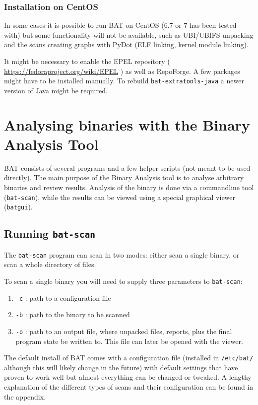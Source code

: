 \documentclass[10pt,a4paper]{article}
\begin{document}
\subsubsection{Installation on CentOS}

In some cases it is possible to run BAT on CentOS (6.7 or 7 has been tested
with) but some functionality will not be available, such as UBI/UBIFS
unpacking and the scans creating graphs with PyDot (ELF linking, kernel module
linking).

It might be necessary to enable the EPEL repository (
\url{https://fedoraproject.org/wiki/EPEL} ) as well as RepoForge. A few
packages might have to be installed manually. To rebuild
\texttt{bat-extratools-java} a newer version of Java might be required.

\section{Analysing binaries with the Binary Analysis Tool}

BAT consists of several programs and a few helper scripts (not meant to be
used directly). The main purpose of the Binary Analysis tool is to analyse
arbitrary binaries and review results. Analysis of the binary is done via
a commandline tool (\texttt{bat-scan}), while the results can be viewed using
a special graphical viewer (\texttt{batgui}).

\subsection{Running \texttt{bat-scan}}

The \texttt{bat-scan} program can scan in two modes: either scan a single
binary, or scan a whole directory of files.

To scan a single binary you will need to supply three parameters to
\texttt{bat-scan}:

\begin{enumerate}
\item \texttt{-c} : path to a configuration file
\item \texttt{-b} : path to the binary to be scanned
\item \texttt{-o} : path to an output file, where unpacked files, reports,
plus the final program state be written to. This file can later be opened with
the viewer.
\end{enumerate}

The default install of BAT comes with a configuration file (installed in
\texttt{/etc/bat/} although this will likely change in the future) with default
settings that have proven to work well but almost everything can be changed or
tweaked. A lengthy explanation of the different types of scans and their
configuration can be found in the appendix.
\end{document}
